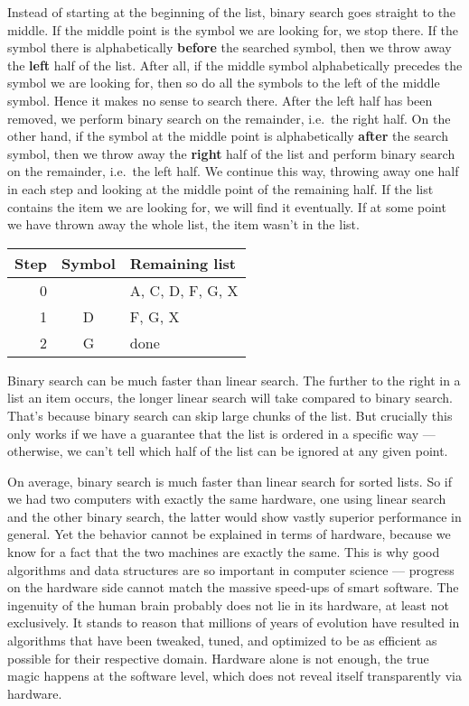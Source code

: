 \begin{examplebox}
    Instead of starting at the beginning of the list, binary search goes straight to the middle.
    If the middle point is the symbol we are looking for, we stop there.
    If the symbol there is alphabetically \textbf{before} the searched symbol, then we throw away the \textbf{left} half of the list.
    After all, if the middle symbol alphabetically precedes the symbol we are looking for, then so do all the symbols to the left of the middle symbol.
    Hence it makes no sense to search there.
    After the left half has been removed, we perform binary search on the remainder, i.e.~the right half.
    On the other hand, if the symbol at the middle point is alphabetically \textbf{after} the search symbol, then we throw away the \textbf{right} half of the list and perform binary search on the remainder, i.e.~the left half.
    We continue this way, throwing away one half in each step and looking at the middle point of the remaining half.
    If the list contains the item we are looking for, we will find it eventually.
    If at some point we have thrown away the whole list, the item wasn't in the list.
    \begin{center}
        \begin{tabular}{rcl}
            \toprule
            \textbf{Step} & \textbf{Symbol} & \textbf{Remaining list}\\
            \midrule
            0 &   & A, C, D, F, G, X\\
            1 & D & F, G, X\\
            2 & G & done\\
            \bottomrule
        \end{tabular}
    \end{center}
    
    Binary search can be much faster than linear search.
    The further to the right in a list an item occurs, the longer linear search will take compared to binary search.
    That's because binary search can skip large chunks of the list.
    But crucially this only works if we have a guarantee that the list is ordered in a specific way --- otherwise, we can't tell which half of the list can be ignored at any given point.
    \label{ex:formal_search}
\end{examplebox}
%
On average, binary search is much faster than linear search for sorted lists.
So if we had two computers with exactly the same hardware, one using linear search and the other binary search, the latter would show vastly superior performance in general.
Yet the behavior cannot be explained in terms of hardware, because we know for a fact that the two machines are exactly the same.
This is why good algorithms and data structures are so important in computer science --- progress on the hardware side cannot match the massive speed-ups of smart software.
The ingenuity of the human brain probably does not lie in its hardware, at least not exclusively.
It stands to reason that millions of years of evolution have resulted in algorithms that have been tweaked, tuned, and optimized to be as efficient as possible for their respective domain.
Hardware alone is not enough, the true magic happens at the software level, which does not reveal itself transparently via hardware.

